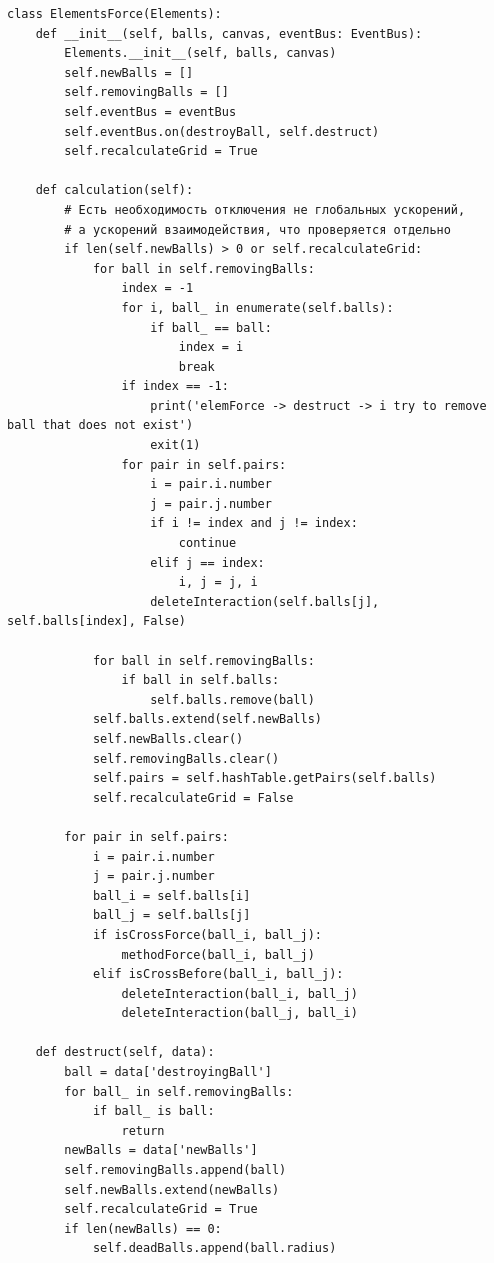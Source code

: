 \documentclass[utf8x, 14pt, oneside, a4paper]{article}
\begin{document}
\begin{lstlisting}
class ElementsForce(Elements):
    def __init__(self, balls, canvas, eventBus: EventBus):
        Elements.__init__(self, balls, canvas)
        self.newBalls = []
        self.removingBalls = []
        self.eventBus = eventBus
        self.eventBus.on(destroyBall, self.destruct)
        self.recalculateGrid = True

    def calculation(self):
        # Есть необходимость отключения не глобальных ускорений,
        # а ускорений взаимодействия, что проверяется отдельно
        if len(self.newBalls) > 0 or self.recalculateGrid:
            for ball in self.removingBalls:
                index = -1
                for i, ball_ in enumerate(self.balls):
                    if ball_ == ball:
                        index = i
                        break
                if index == -1:
                    print('elemForce -> destruct -> i try to remove ball that does not exist')
                    exit(1)
                for pair in self.pairs:
                    i = pair.i.number
                    j = pair.j.number
                    if i != index and j != index:
                        continue
                    elif j == index:
                        i, j = j, i
                    deleteInteraction(self.balls[j], self.balls[index], False)

            for ball in self.removingBalls:
                if ball in self.balls:
                    self.balls.remove(ball)
            self.balls.extend(self.newBalls)
            self.newBalls.clear()
            self.removingBalls.clear()
            self.pairs = self.hashTable.getPairs(self.balls)
            self.recalculateGrid = False

        for pair in self.pairs:
            i = pair.i.number
            j = pair.j.number
            ball_i = self.balls[i]
            ball_j = self.balls[j]
            if isCrossForce(ball_i, ball_j):
                methodForce(ball_i, ball_j)
            elif isCrossBefore(ball_i, ball_j):
                deleteInteraction(ball_i, ball_j)
                deleteInteraction(ball_j, ball_i)

    def destruct(self, data):
        ball = data['destroyingBall']
        for ball_ in self.removingBalls:
            if ball_ is ball:
                return
        newBalls = data['newBalls']
        self.removingBalls.append(ball)
        self.newBalls.extend(newBalls)
        self.recalculateGrid = True
        if len(newBalls) == 0:
            self.deadBalls.append(ball.radius)


\end{lstlisting}
\end{document}
